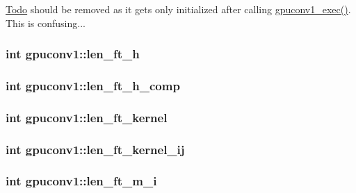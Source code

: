 \begin{Desc}
\item[\hyperlink{todo__todo000005}{Todo}]should be removed as it gets only initialized after calling \hyperlink{gpuconv1_8h_a290a0200b1639a156c1767f74bf5b94e}{gpuconv1\_\-exec()}. This is confusing... \end{Desc}
\hypertarget{structgpuconv1_a66b8409b83c7f36e959bc8e44c06f185}{
\subsubsection[{len\_\-ft\_\-h}]{\setlength{\rightskip}{0pt plus 5cm}int {\bf gpuconv1::len\_\-ft\_\-h}}}
\label{structgpuconv1_a66b8409b83c7f36e959bc8e44c06f185}
\hypertarget{structgpuconv1_abe43d21facbf130daaa887a0c03b703a}{
\subsubsection[{len\_\-ft\_\-h\_\-comp}]{\setlength{\rightskip}{0pt plus 5cm}int {\bf gpuconv1::len\_\-ft\_\-h\_\-comp}}}
\label{structgpuconv1_abe43d21facbf130daaa887a0c03b703a}
\hypertarget{structgpuconv1_a2e78aeb1d0ac1b1bfd75c768cb0e97df}{
\subsubsection[{len\_\-ft\_\-kernel}]{\setlength{\rightskip}{0pt plus 5cm}int {\bf gpuconv1::len\_\-ft\_\-kernel}}}
\label{structgpuconv1_a2e78aeb1d0ac1b1bfd75c768cb0e97df}
\hypertarget{structgpuconv1_a7093083f3cc3697777737cb78c940c12}{
\subsubsection[{len\_\-ft\_\-kernel\_\-ij}]{\setlength{\rightskip}{0pt plus 5cm}int {\bf gpuconv1::len\_\-ft\_\-kernel\_\-ij}}}
\label{structgpuconv1_a7093083f3cc3697777737cb78c940c12}
\hypertarget{structgpuconv1_aa277feb9a1878f2b6f8f6e32b54473b1}{
\subsubsection[{len\_\-ft\_\-m\_\-i}]{\setlength{\rightskip}{0pt plus 5cm}int {\bf gpuconv1::len\_\-ft\_\-m\_\-i}}}
\label{structgpuconv1_aa277feb9a1878f2b6f8f6e32b54473b1}


